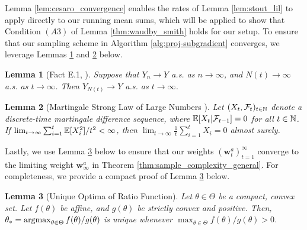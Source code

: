 \documentclass{article}
\newtheorem{lemma}{Lemma}
\begin{document}
\begin{appendices}
Lemma \ref{lem:cesaro_convergence} enables the rates of Lemma \ref{lem:stout_lil} to apply directly to our running mean sums, which will be applied to show that Condition $(A3)$ of Lemma \ref{thm:waudby_smith} holds for our setup. To ensure that our sampling scheme in Algorithm \ref{alg:proj-subgradient} converges, we leverage Lemmas \ref{lem:convergence_bandit} and \ref{lem:mslln} below. 

\begin{lemma}[Fact E.1, \citealp{fact_e1}]\label{lem:convergence_bandit}
        Suppose that $Y_n \rightarrow Y$ a.s. as $n \rightarrow \infty$, and $N(t) \rightarrow \infty$ a.s. as $t \rightarrow \infty$. Then $Y_{N(t)} \rightarrow Y$ a.s. as $t \rightarrow \infty$.
\end{lemma}

\begin{lemma}[Martingale Strong Law of Large Numbers \cite{hall2014martingale}]\label{lem:mslln}
    Let $(X_t, \mathcal{F}_t)_{t \in \mathbb{N}}$ denote a discrete-time martingale difference sequence, where $\mathbb{E}[X_t|\mathcal{F}_{t-1}] = 0$ for all $t \in \mathbb{N}$. If $\lim_{t \rightarrow \infty}\sum_{i=1}^t \mathbb{E}[X_i^2]/t^2 < \infty$, then $\lim_{t \rightarrow \infty}\frac{1}{t}\sum_{i=1}^t X_i = 0$ almost surely.  
\end{lemma}

Lastly, we use Lemma \ref{lem:unique_optima} below to ensure that our weights $(\bm{w}_t^a)_{t=1}^\infty$ converge to the limiting weight $\bm{w}_\infty^a$ in Theorem \ref{thm:sample_complexity_general}. For completeness, we provide a compact proof of Lemma \ref{lem:unique_optima} below. 



\begin{lemma}[Unique Optima of Ratio Function]\label{lem:unique_optima}
Let $\theta \in \Theta $ be a compact, convex set. Let $f(\theta)$ be affine, and $g(\theta)$ be strictly convex and positive. Then, $\theta_* = \argmax_{\theta \in \Theta}  f(\theta)/g(\theta)$ is unique whenever $\max_{\theta \in \Theta}  f(\theta)/g(\theta)>0$. 
\end{lemma}


\end{appendices}
\end{document}
